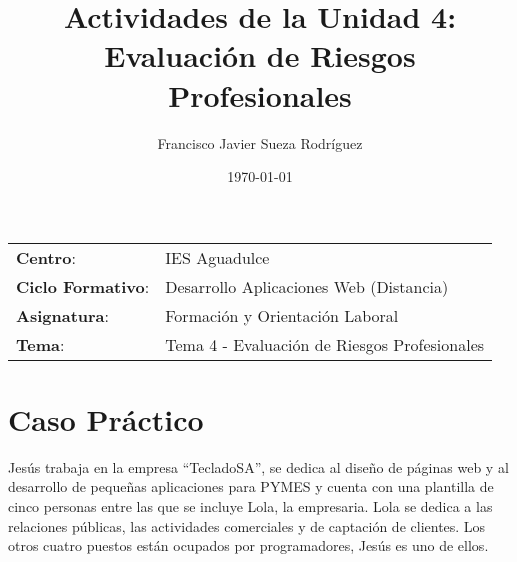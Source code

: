 


\title{
\vspace{10ex}
\normalfont \normalsize
\huge \textbf{Actividades de la Unidad 4: Evaluación de Riesgos Profesionales}
}
\author{Francisco Javier Sueza Rodríguez}
\date{\normalsize\today}



\maketitle

\thispagestyle{empty}

\vspace{65ex}

\begin{center}
    \begin{tabular}{l l}
        \textbf{Centro}: & IES Aguadulce \\
        \textbf{Ciclo Formativo}: & Desarrollo Aplicaciones Web (Distancia)\\
        \textbf{Asignatura}: & Formación y Orientación Laboral\\
        \textbf{Tema}: & Tema 4 -  Evaluación de Riesgos Profesionales\\
    \end{tabular}
\end{center}

\newpage

\tableofcontents

\newpage
\section{Caso Práctico}
Jesús trabaja en la empresa  ``TecladoSA'', se dedica al diseño de páginas web y al desarrollo de pequeñas aplicaciones para PYMES y cuenta con una plantilla de cinco personas entre las que se incluye Lola, la empresaria. Lola se dedica a las relaciones públicas, las actividades comerciales y de captación de clientes. Los otros cuatro puestos están ocupados por programadores, Jesús es uno de ellos.

